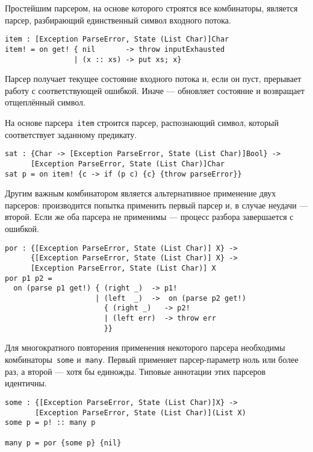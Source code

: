 \documentclass [a4paper] {article}
\begin{document}
Простейшим парсером, на основе которого строятся все комбинаторы, является
парсер, разбирающий единственный символ входного потока. 

\begin{verbatim}
item : [Exception ParseError, State (List Char)]Char
item! = on get! { nil       -> throw inputExhausted
                | (x :: xs) -> put xs; x} 
\end{verbatim}

Парсер получает текущее состояние входного потока и, если он пуст, прерывает
работу с соответствующей ошибкой. Иначе --- обновляет состояние и возвращает
отщеплённый символ.

На основе парсера~\texttt{item} строится парсер, распознающий символ, который
соответствует заданному предикату.

\begin{verbatim}
sat : {Char -> [Exception ParseError, State (List Char)]Bool} -> 
      [Exception ParseError, State (List Char)]Char
sat p = on item! {c -> if (p c) {c} {throw parseError}}
\end{verbatim}

Другим важным комбинатором является альтернативное применение двух парсеров:
производится попытка применить первый парсер и, в случае неудачи --- второй.
Если же оба парсера не применимы --- процесс разбора завершается с ошибкой.

\begin{verbatim}
por : {[Exception ParseError, State (List Char)] X} -> 
      {[Exception ParseError, State (List Char)] X} -> 
      [Exception ParseError, State (List Char)] X
por p1 p2 = 
  on (parse p1 get!) { (right _)  -> p1! 
                     | (left  _)  ->  on (parse p2 get!) 
                       { (right _)   -> p2!
                       | (left err)  -> throw err
                       }}

\end{verbatim}

Для многократного повторения применения некоторого парсера необходимы
комбинаторы~\texttt{some} и~\texttt{many}. Первый применяет парсер-параметр
ноль или более раз, а второй --- хотя бы единожды. Типовые аннотации этих
парсеров идентичны.

\begin{verbatim}
some : {[Exception ParseError, State (List Char)]X} ->
       [Exception ParseError, State (List Char)](List X)
some p = p! :: many p

many p = por {some p} {nil}
\end{verbatim}
\end{document}

